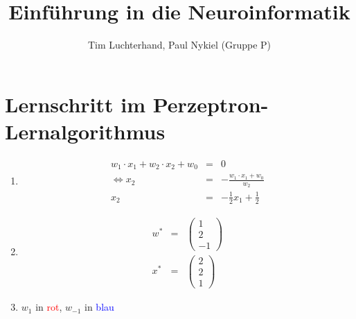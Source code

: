 \documentclass[DIN, pagenumber=false, fontsize=11pt, parskip=half]{scrartcl}
\title{Einführung in die Neuroinformatik}
\author{Tim Luchterhand, Paul Nykiel (Gruppe P)}
\begin{document}
    \maketitle
    \section{Lernschritt im Perzeptron-Lernalgorithmus}
    \begin{enumerate}[label=(\alph*)]
        \item
            \begin{eqnarray*}
                w_1 \cdot x_1 + w_2 \cdot x_2 + w_0 &=& 0 \\
                \Leftrightarrow x_2 &=& -\frac{w_1 \cdot x_1 + w_0}{w_2} \\
                x_2 &=& -\frac{1}{2} x_1 + \frac{1}{2}
            \end{eqnarray*}
            \begin{figure}[H]
                \centering
            \end{figure}
        \item
            \begin{eqnarray*}
                w^* &=& \begin{pmatrix}
                    1 \\ 2\\ -1
                \end{pmatrix} \\
                x^* &=& \begin{pmatrix}
                    2 \\ 2\\ 1
                \end{pmatrix}
            \end{eqnarray*}
        \item $w_1$ in \textcolor{red}{rot}, $w_{-1}$ in \textcolor{blue}{blau}
            \begin{figure}[H]

\end{figure}
\end{enumerate}
\end{document}
